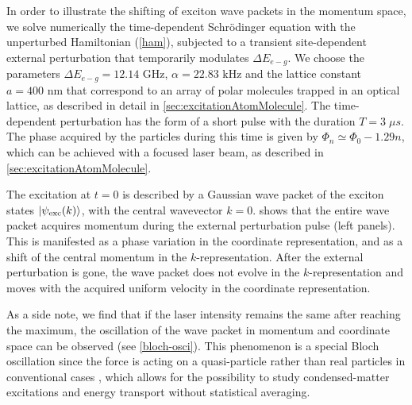 In order to illustrate the shifting of exciton wave packets in the
momentum space, we solve numerically the time-dependent
Schr\"{o}dinger equation with the unperturbed Hamiltonian
(\ref{ham}),  subjected to a transient site-dependent external
perturbation that temporarily modulates $\Delta E_{e-g}$.
We choose the parameters $\Delta E_{e-g} =12.14\mbox{ GHz}$, $\alpha =22.83\mbox{ kHz}$ and the lattice constant $a=400\mbox{ nm}$ that correspond to an array of
polar molecules trapped in an optical lattice, as described in detail in \autoref{sec:excitationAtomMolecule}.
The time-dependent perturbation has the form of a short pulse with the duration $T = 3\; \mu s$. %
The phase acquired by the particles during this time is given by $\Phi_n \simeq \Phi_0  -1.29 n $, which can be achieved with a focused laser beam, as described in \autoref{sec:excitationAtomMolecule}.



The excitation at $t=0$ is described by
a Gaussian wave packet of the exciton states $|\psi_{\rm
exc}(k)\rangle$, with the central wavevector $k=0$.
 shows that the
entire wave packet acquires momentum during the external perturbation pulse (left
panels). This is manifested as a phase variation in the coordinate
representation, and as a shift of the central momentum in the
$k$-representation. After the external perturbation is gone, the
wave packet does not evolve in the $k$-representation and moves
with the acquired uniform velocity in the coordinate
representation.

As a side note, we find that if the laser intensity remains the
same after reaching the maximum, the oscillation
of the wave packet in momentum and coordinate space can be observed  (see 
\autoref{bloch-osci}). This phenomenon is a special Bloch oscillation
since the force is acting on a quasi-particle rather than real
particles in conventional cases  \cite{b-oscillation}, which allows for the possibility to study condensed-matter excitations and energy transport without statistical averaging.


